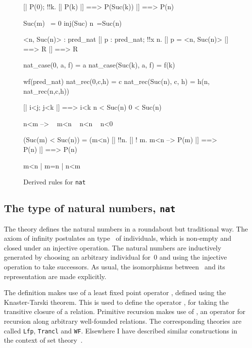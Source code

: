 \begin{figure} \underscoreon
\begin{ttbox}
     [| P(0); !!k. [| P(k) |] ==> P(Suc(k)) |]  ==> P(n)

   Suc(m) ~= 0
        inj(Suc)
    n~=Suc(n)

      <n, Suc(n)> : pred_nat
    [| p : pred_nat;  !!x n. [| p = <n, Suc(n)> |] ==> R |] ==> R

     nat_case(0, a, f) = a
   nat_case(Suc(k), a, f) = f(k)

    wf(pred_nat)
      nat_rec(0,c,h) = c
    nat_rec(Suc(n), c, h) = h(n, nat_rec(n,c,h))

     [| i<j;  j<k |] ==> i<k
          n < Suc(n)
  0 < Suc(n)

   n<m --> ~ m<n 
  ~ n<n
      ~ n<0

    (Suc(m) < Suc(n)) = (m<n)
    [| !!n. [| ! m. m<n --> P(m) |] ==> P(n) |]  ==>  P(n)

    m<n | m=n | n<m
\end{ttbox}
\caption{Derived rules for {\tt nat}} \label{hol-nat2}
\end{figure}


\subsection{The type of natural numbers, {\tt nat}}
The theory  defines the natural numbers in a roundabout but
traditional way.  The axiom of infinity postulates an type~ of
individuals, which is non-empty and closed under an injective operation.
The natural numbers are inductively generated by choosing an arbitrary
individual for~0 and using the injective operation to take successors.  As
usual, the isomorphisms between~ and its representation are made
explicitly.

The definition makes use of a least fixed point operator ,
defined using the Knaster-Tarski theorem.  This is used to define the
operator , for taking the transitive closure of a relation.
Primitive recursion makes use of , an operator for recursion
along arbitrary well-founded relations.  The corresponding theories are
called {\tt Lfp}, {\tt Trancl} and {\tt WF}\@.  Elsewhere I have described
similar constructions in the context of set theory~\cite{paulson-set-II}.

